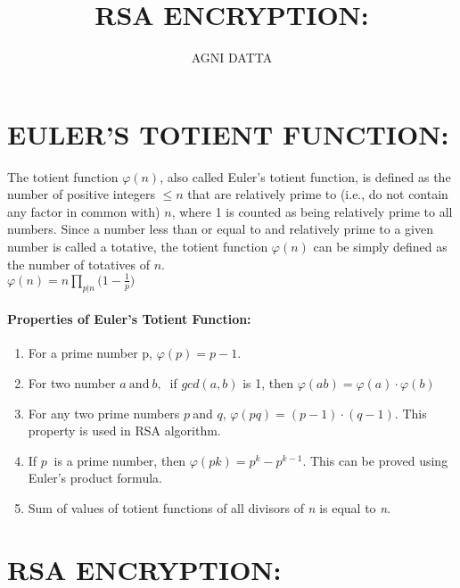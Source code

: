 \documentclass[10pt,fleqn]{article}
\begin{document}
\title{\textbf{\huge{}RSA ENCRYPTION:}}
\author{AGNI DATTA}

\maketitle
\tableofcontents{}

\pagebreak{}

\part{EULER'S TOTIENT FUNCTION:}

\medskip{}

The totient function $\varphi(n)$, also called Euler's totient function,
is defined as the number of positive integers $\leq n$ that are relatively
prime to (i.e., do not contain any factor in common with) $n$, where
1 is counted as being relatively prime to all numbers. Since a number
less than or equal to and relatively prime to a given number is called
a totative, the totient function $\varphi(n)$ can be simply defined
as the number of totatives of $n$.\\

$\displaystyle\varphi(n)=n\prod_{p|n}\bigg(1-\frac{1}{p}\bigg)$
\\

\subsection{Properties of Euler’s Totient Function:}
\begin{enumerate}
\item For a prime number p, $\varphi(p)= p-1$.
\item For two number $a\:\textrm{and}\:b,\:$ if $gcd(a,b)$ is 1, then
$\varphi(ab)=\varphi(a)\cdot\varphi(b)$
\item For any two prime numbers $p\:$and $q$, $\varphi(pq)=(p-1)\cdot(q-1)$.
This property is used in RSA algorithm. 
\item If $p\:$ is a prime number, then $\varphi(pk)=p^k - p^{k-1}$. This
can be proved using Euler’s product formula.
\item Sum of values of totient functions of all divisors of \textit{n} is equal to \textit{n}.
\end{enumerate}
\pagebreak{}

\part{RSA ENCRYPTION:}
\end{document}
